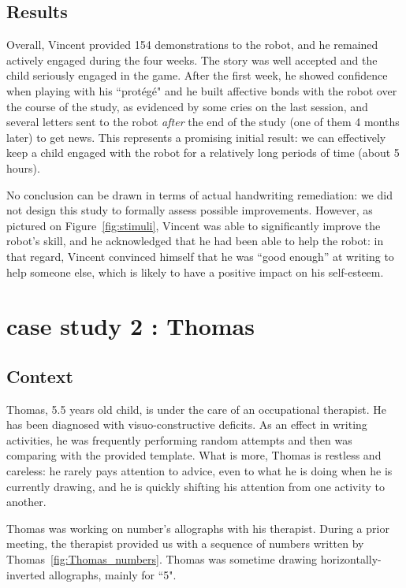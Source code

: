 \documentclass{sig-alternate}
\begin{document}
\subsection{Results}
Overall, Vincent provided 154 demonstrations to the robot, and he remained
actively engaged during the four weeks. The story was well accepted and
the child seriously engaged in the game. After the first week, he showed
confidence when playing with his ``prot\'eg\'e" and he built affective bonds with the robot
over the course of the study, as evidenced by some cries on the last session,
and several letters sent to the robot \emph{after} the end of the study
(one of them 4 months later) to get news. This represents a promising initial
result: we can effectively keep a child engaged with the robot for a relatively
long periods of time (about 5 hours).

No conclusion can be drawn in terms of actual handwriting remediation: we did
not design this study to formally assess possible improvements. However, as pictured on Figure~\ref{fig:stimuli}, Vincent was able to
significantly improve the robot's skill, and he acknowledged that he had been
able to help the robot: in that regard, Vincent convinced himself that he was
``good enough'' at writing to help someone else, which is likely to have
a positive impact on his self-esteem.



\section{case study 2 : Thomas}\label{Thomas}

\subsection{Context}

Thomas, 5.5 years old child, is under the care of an occupational
therapist. He has been diagnosed with visuo-constructive deficits.
As an effect in writing activities, he was frequently performing random attempts and then was comparing
with the provided template. What is more, Thomas is restless and careless: he
rarely pays attention to
advice, even to what he is doing when he is currently drawing, and he is
quickly shifting his attention from one activity to another.

Thomas was working on number's allographs with his therapist. During a prior
meeting, the therapist provided us with a sequence of numbers
written by Thomas~\ref{fig:Thomas_numbers}. Thomas was sometime drawing
horizontally-inverted allographs, mainly for ``5".
\end{document}
